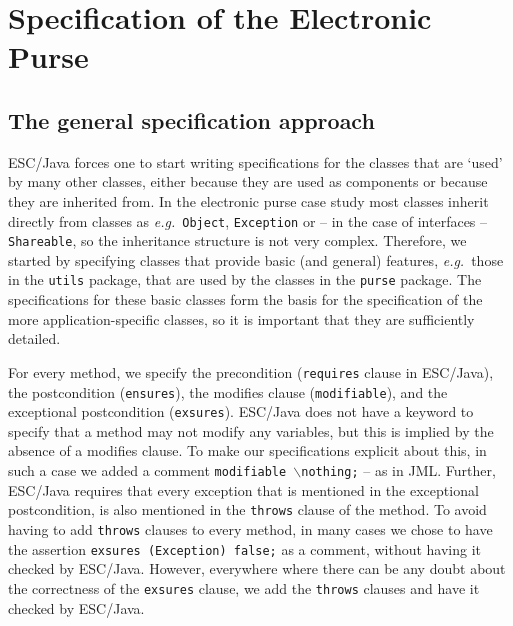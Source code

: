 \documentclass[a4paper]{llncs}
\newcommand{\noth}{\(\backslash\)\texttt{nothing}}
\begin{document}
\section{Specification of the Electronic Purse}
\label{SectSpecPurse}


\subsection{The general specification approach}
ESC/Java forces one to start writing specifications for the classes
that are `used' by many other classes, either because they are used as 
components or because they are inherited from. In the electronic purse 
case study most classes inherit directly from classes as
\emph{e.g.}~\texttt{Object}, \texttt{Exception} or -- in the case of
interfaces -- \texttt{Shareable}, so the inheritance structure is not
very complex. Therefore, we started by specifying classes that
provide basic (and general) features, \emph{e.g.}~those in the
\texttt{utils} package,
that are used by the classes in the \texttt{purse} package. The
specifications for these basic classes form the basis for the
specification of the more application-specific classes, so it is
important that they are sufficiently detailed.

For every method, we specify the precondition (\texttt{requires} clause
in ESC/Java), the postcondition (\texttt{ensures}), the modifies
clause (\texttt{modifiable}), and the exceptional postcondition
(\texttt{exsures}). ESC/Java does not have a keyword to specify that a
method may not modify any variables, but this is implied by the
absence of a modifies clause. To make our specifications explicit
about this, in such a case we added a comment
\texttt{modifiable \noth;} -- as in JML. Further, ESC/Java requires 
that every exception that is mentioned in the exceptional
postcondition, is also mentioned in the \texttt{throws} clause of the
method. To avoid having to add \texttt{throws} clauses to every method,
in many cases we chose to have the assertion \texttt{exsures
(Exception) false;} as a comment, without having it checked by
ESC/Java. However, everywhere where there can be any doubt about the
correctness of the \texttt{exsures} clause, we add the \texttt{throws}
clauses and have it checked by ESC/Java.
\end{document}

